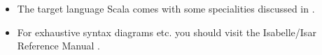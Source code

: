 \begin{isabellebody}
\begin{isamarkuptext}
\begin{itemize}
    \item The target language Scala \cite{scala-overview-tech-report}
      comes with some specialities discussed in .

    \item For exhaustive syntax diagrams etc. you should visit the
      Isabelle/Isar Reference Manual \cite{isabelle-isar-ref}.

  \end{itemize}

  \bigskip

  \begin{center}\end{center}%
\end{isamarkuptext}%
\isamarkuptrue%
%
\isadelimtheory
%
\endisadelimtheory
%
\isatagtheory
{}\isamarkupfalse%
%
\endisatagtheory
{\isafoldtheory}%
%
\isadelimtheory
%
\endisadelimtheory
\isanewline
\isanewline
\end{isabellebody}%
